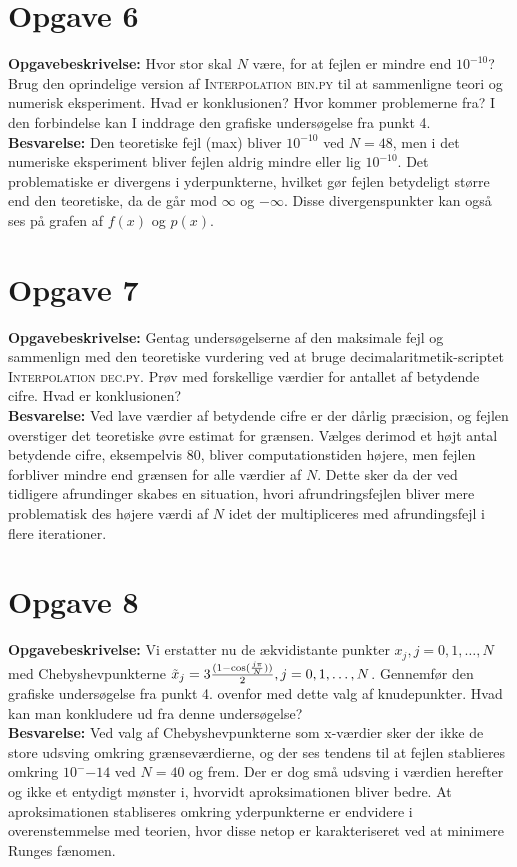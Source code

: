 \section*{Opgave 6}
\textbf{Opgavebeskrivelse:} Hvor stor skal $N$ være, for at fejlen er mindre end $10^{-10}$? 
Brug den oprindelige version af \textsc{Interpolation bin.py} til at sammenligne teori og numerisk eksperiment. 
Hvad er konklusionen? 
Hvor kommer problemerne fra? 
I den forbindelse kan I inddrage den grafiske undersøgelse fra punkt 4.
\\
\textbf{Besvarelse:} Den teoretiske fejl (max) bliver $10^{-10}$ ved $N=48$, men i det numeriske eksperiment bliver fejlen aldrig mindre eller lig $10^{-10}$. Det problematiske er divergens i yderpunkterne, hvilket gør fejlen betydeligt større end den teoretiske, da de går mod $ \infty $ og $ - \infty $. Disse divergenspunkter kan også ses på grafen af $f(x)$ og $p(x)$. 
\section*{Opgave 7}
\textbf{Opgavebeskrivelse:} Gentag undersøgelserne af den maksimale fejl og sammenlign med den teoretiske vurdering ved at bruge decimalaritmetik-scriptet \textsc{Interpolation dec.py}. 
Prøv med forskellige værdier for antallet af betydende cifre. 
Hvad er konklusionen?
\\
\textbf{Besvarelse:} 
Ved lave værdier af betydende cifre er der dårlig præcision, og fejlen overstiger det teoretiske øvre estimat for grænsen. 
Vælges derimod et højt antal betydende cifre, eksempelvis $80$, bliver computationstiden højere, men fejlen forbliver mindre end grænsen for alle værdier af $N$.
Dette sker da der ved tidligere afrundinger skabes en situation, hvori afrundringsfejlen bliver mere problematisk des højere værdi af $N$ idet der multipliceres med afrundingsfejl i flere iterationer.
\section*{Opgave 8}
\textbf{Opgavebeskrivelse:} Vi erstatter nu de ækvidistante punkter $x_j , j = 0, 1, \ldots , N$ med Chebyshevpunkterne $\Tilde{x}_j = 3 \frac{(1 -\cos(\frac{j \pi}{N}))}{2}, j = 0, 1, \ldots , N$. 
Gennemfør den grafiske undersøgelse fra punkt 4. ovenfor med dette valg af knudepunkter. 
Hvad kan man konkludere ud fra denne undersøgelse?
\\
\textbf{Besvarelse:} 
Ved valg af Chebyshevpunkterne som x-værdier sker der ikke de store udsving omkring grænseværdierne, og der ses tendens til at fejlen stablieres omkring $10^-{-14}$ ved $N=40$ og frem. 
Der er dog små udsving i værdien herefter og ikke et entydigt mønster i, hvorvidt aproksimationen bliver bedre.
At aproksimationen stabliseres omkring yderpunkterne er endvidere i overenstemmelse med teorien, hvor disse netop er karakteriseret ved at minimere Runges fænomen.
